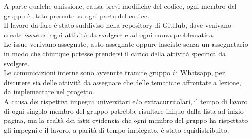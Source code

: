 A parte qualche omissione, causa brevi modifiche del codice, ogni membro del gruppo è stato presente su ogni parte del codice.\\
Il lavoro da fare è stato suddiviso nella repository di GitHub, dove venivano create \emph{issue} ad ogni attività da svolgere e ad ogni nuova problematica.\\
Le issue venivano assegnate, auto-assegnate oppure lasciate senza un assegnatario in modo che chiunque potesse prendersi il carico della attività specifica da svolgere.\\
Le comunicazioni interne sono avvenute tramite gruppo di Whatsapp, per discutere sia delle attività da assegnare che delle tematiche affrontate a lezione, da implementare nel progetto.\\
A causa dei rispettivi impegni universitari e/o extracurricolari, il tempo di lavoro di ogni singolo membro del gruppo potrebbe risultare iniquo dalla lista ad inizio pagina, ma la realtà dei fatti evidenzia che ogni membro del gruppo ha rispettato gli impegni e il lavoro, a parità di tempo impiegato, è stato equidistribuito.\\

 